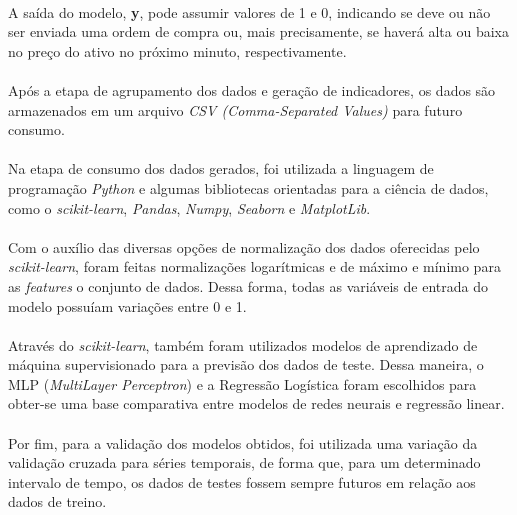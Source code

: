 \documentclass[grad,numbers]{coppe}
\begin{document}
    \paragraph{}A saída do modelo, \textbf{y}, pode assumir valores de 1 e 0, indicando se deve ou não ser enviada uma ordem de compra ou, mais precisamente, se haverá alta ou baixa no preço do ativo no próximo minuto, respectivamente.
    
    \paragraph{}Após a etapa de agrupamento dos dados e geração de indicadores, os dados são armazenados em um arquivo \textit{CSV (Comma-Separated Values)} para futuro consumo.
    
    \paragraph{}Na etapa de consumo dos dados gerados, foi utilizada a linguagem de programação \textit{Python} e algumas bibliotecas orientadas para a ciência de dados, como o \textit{scikit-learn}, \textit{Pandas}, \textit{Numpy}, \textit{Seaborn} e \textit{MatplotLib}.
    
    \paragraph{}Com o auxílio das diversas opções de normalização dos dados oferecidas pelo \textit{scikit-learn}, foram feitas normalizações logarítmicas e de máximo e mínimo para as \textit{features} o conjunto de dados. Dessa forma, todas as variáveis de entrada do modelo possuíam variações entre 0 e 1.
    
    \paragraph{}Através do \textit{scikit-learn}, também foram utilizados modelos de aprendizado de máquina supervisionado para a previsão dos dados de teste. Dessa maneira, o MLP (\textit{MultiLayer Perceptron}) e a Regressão Logística foram escolhidos para obter-se uma base comparativa entre modelos de redes neurais e regressão linear.
    
    \paragraph{}Por fim, para a validação dos modelos obtidos, foi utilizada uma variação da validação cruzada para séries temporais, de forma que, para um determinado intervalo de tempo, os dados de testes fossem sempre futuros em relação aos dados de treino.
  
\end{document}
